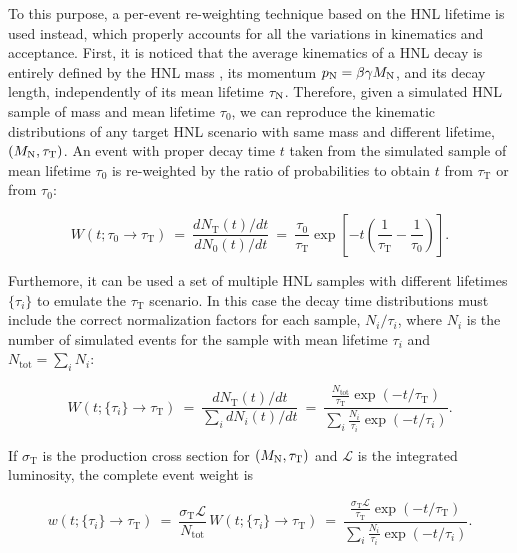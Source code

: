 To this purpose, a per-event re-weighting technique
based on the HNL lifetime is used instead, which properly accounts for all the
variations in kinematics and acceptance.
First, it is noticed that the average kinematics of a HNL decay
is entirely defined by the HNL mass \mhnl, its momentum
$p_\mathrm{N}=\beta\gamma M_{\mathrm{N}}$, and its decay length,
independently of its mean lifetime $\tau_\mathrm{N}$.
Therefore, given a simulated HNL sample of mass \mhnl
and mean lifetime $\tau_0$, we can reproduce the kinematic
distributions of any target HNL scenario with same mass and 
different lifetime, $(M_{\mathrm{N}}, \tau_{\mathrm T})$.
An event with proper decay time $t$ taken from the simulated sample
of mean lifetime $\tau_0$ is re-weighted by the ratio of
probabilities to obtain $t$ from $\tau_{\mathrm T}$ or from $\tau_0$:
\begin{linenomath}
  \begin{equation}
    W(t; \tau_0\to\tau_{\mathrm T}) ~=~ \frac{dN_{\mathrm T}(t)/dt}{dN_0(t)/dt} ~=~
    \frac{\tau_0}{\tau_{\mathrm T}}\exp{\left[-t\left(\frac{1}{\tau_{\mathrm T}}-\frac{1}{\tau_0}\right)\right]}.
  \label{eq:ctauReweightingSingle}
  \end{equation}
\end{linenomath}
Furthemore, it can be used a set of multiple HNL samples with different lifetimes
$\{\tau_i\}$ to emulate the $\tau_{\mathrm T}$ scenario. In this case the
decay time distributions must include the correct normalization
factors for each sample, $N_i/\tau_i$, where $N_i$ is the number of
simulated events for the sample with mean lifetime $\tau_i$ and
$N_{\mathrm{tot}} = \sum_i N_i$:
\begin{linenomath}
  \begin{equation*}
    W(t; \{\tau_i\}\to\tau_{\mathrm T}) ~=~ \frac{dN_{\mathrm T}(t)/dt}{\sum_i dN_i(t)/dt} ~=~
    \frac{\frac{N_{\mathrm{tot}}}{\tau_{\mathrm{T}}}\exp{(-t/\tau_{\mathrm{T}})}}
         {\sum_i\frac{N_{i}}{\tau_i}\exp{(-t/\tau_i)}}.
  \end{equation*}
\end{linenomath}
If $\sigma_{\mathrm{T}}$ is the production cross section for
$(M_{\mathrm{N}},\tau_{\mathrm T})$ and $\mathcal{L}$ is the integrated luminosity,
the complete event weight is
\begin{linenomath}
  \begin{equation}
    w(t; \{\tau_i\}\to\tau_{\mathrm T}) ~=~
    \frac{\sigma_{\mathrm{T}}\mathcal{L}}{N_{\mathrm{tot}}}\,W(t;\{\tau_i\}\to\tau_{\mathrm T})
     ~=~ \frac{\frac{\sigma_{\mathrm{T}}\mathcal{L}}{\tau_{\mathrm{T}}}\exp{(-t/\tau_{\mathrm{T}})}}
         {\sum_i\frac{N_{i}}{\tau_i}\exp{(-t/\tau_i)}}.
  \label{eq:ctauReweighting}
  \end{equation}
\end{linenomath}
